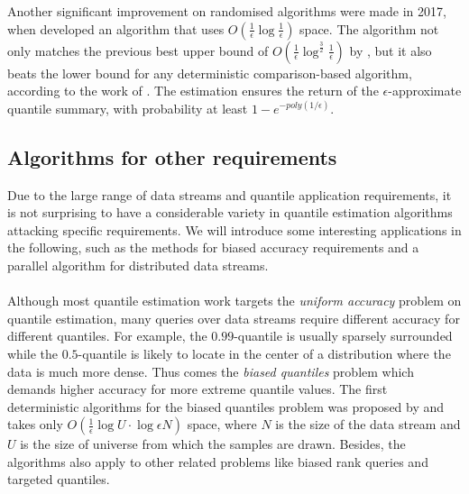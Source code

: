 Another significant improvement on randomised algorithms were made in 2017, when \citeauthor{felberRandomizedOnlineQuantile2017}\cite{felberRandomizedOnlineQuantile2017} developed an algorithm that uses $O(\frac{1}{\epsilon}\log \frac{1}{\epsilon})$ space. The algorithm not only matches the previous best upper bound of $O(\frac{1}{\epsilon}\log^{\frac{3}{2}}\frac{1}{\epsilon})$ by \citeauthor{agarwalMergeableSummaries2013}\cite{agarwalMergeableSummaries2013}, but it also beats the lower bound for any deterministic comparison-based algorithm, according to the work of \citeauthor{hungLogSpaceLower2010}\cite{hungLogSpaceLower2010}. The estimation ensures the return of the $\epsilon$-approximate quantile summary, with probability at least $1-e^{-poly(1/\epsilon)}$.


\subsection{Algorithms for other requirements}
\label{other}
Due to the large range of data streams and quantile application requirements, it is not surprising to have a considerable variety in quantile estimation algorithms attacking specific requirements. We will introduce some interesting applications in the following, such as the methods for biased accuracy requirements and a parallel algorithm for distributed data streams.
\\\\
Although most quantile estimation work targets the \textit{uniform accuracy} problem on quantile estimation, many queries over data streams require different accuracy for different quantiles. For example, the $0.99$-quantile is usually sparsely surrounded while the $0.5$-quantile is likely to locate in the center of a distribution where the data is much more dense. Thus comes the \textit{biased quantiles} problem which demands higher accuracy for more extreme quantile values.
The first deterministic algorithms for the biased quantiles problem was proposed by \citeauthor{cormodeSpaceTimeefficientDeterministic2006} \cite{cormodeSpaceTimeefficientDeterministic2006} and takes only $O(\frac{1}{\epsilon} \log {U} \cdot \log {\epsilon N})$ space, where $N$ is the size of the data stream and $U$ is the size of universe from which the samples are drawn. Besides, the algorithms also apply to other related problems like biased rank queries and targeted quantiles. 

